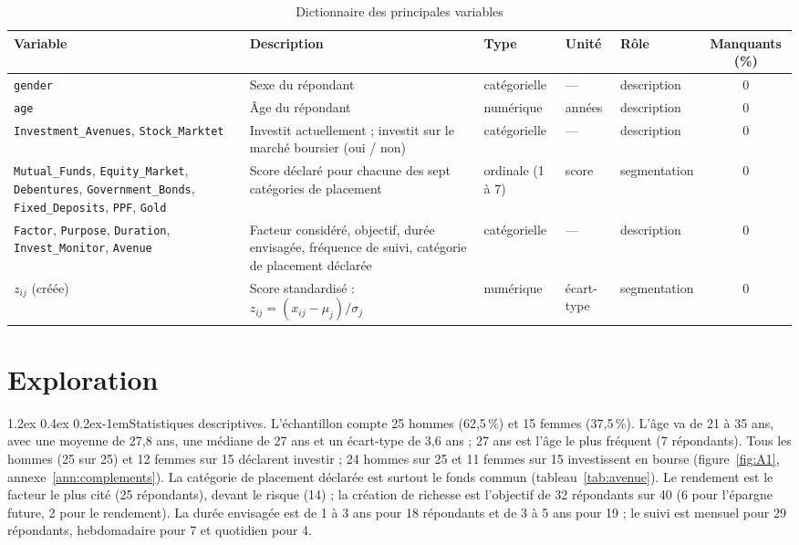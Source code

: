 \documentclass[11pt,a4paper]{article}
\makeatletter
\renewcommand\paragraph{\@startsection{paragraph}{4}{\z@}%
  {1.2ex \@plus 0.4ex \@minus 0.2ex}{-1em}{\normalfont\normalsize\bfseries}}
\makeatother
\begin{document}
\begin{table}[htbp]
  \centering
  \caption{Dictionnaire des principales variables}
  \label{tab:dictionnaire}
  \small
  \begin{tabular}{@{}l P{5.6cm} l l l c@{}}
    \toprule
    Variable & Description & Type & Unité & Rôle & Manquants (\%) \\
    \midrule
    \texttt{gender} & Sexe du répondant & catégorielle & --- & description & 0 \\
    \texttt{age} & Âge du répondant & numérique & années & description & 0 \\
    \texttt{Investment\_Avenues}, \texttt{Stock\_Marktet} & Investit actuellement ; investit sur le marché boursier (oui / non) & catégorielle & --- & description & 0 \\
    \texttt{Mutual\_Funds}, \texttt{Equity\_Market}, \texttt{Debentures}, \texttt{Government\_Bonds}, \texttt{Fixed\_Deposits}, \texttt{PPF}, \texttt{Gold} & Score déclaré pour chacune des sept catégories de placement & ordinale (1 à 7) & score & segmentation & 0 \\
    \texttt{Factor}, \texttt{Purpose}, \texttt{Duration}, \texttt{Invest\_Monitor}, \texttt{Avenue} & Facteur considéré, objectif, durée envisagée, fréquence de suivi, catégorie de placement déclarée & catégorielle & --- & description & 0 \\
    $z_{ij}$ (créée) & Score standardisé : $z_{ij} = (x_{ij} - \mu_j)/\sigma_j$ & numérique & écart-type & segmentation & 0 \\
    \bottomrule
  \end{tabular}
\end{table}

\section{Exploration}
\label{sec:exploration}
\paragraph{Statistiques descriptives.} L'échantillon compte 25 hommes (62,5\,\%) et 15 femmes (37,5\,\%). L'âge va de 21 à 35 ans, avec une moyenne de 27,8 ans, une médiane de 27 ans et un écart-type de 3,6 ans ; 27 ans est l'âge le plus fréquent (7 répondants). Tous les hommes (25 sur 25) et 12 femmes sur 15 déclarent investir ; 24 hommes sur 25 et 11 femmes sur 15 investissent en bourse (figure~\ref{fig:A1}, annexe~\ref{ann:complements}). La catégorie de placement déclarée est surtout le fonds commun (tableau~\ref{tab:avenue}). Le rendement est le facteur le plus cité (25 répondants), devant le risque (14) ; la création de richesse est l'objectif de 32 répondants sur 40 (6 pour l'épargne future, 2 pour le rendement). La durée envisagée est de 1 à 3 ans pour 18 répondants et de 3 à 5 ans pour 19 ; le suivi est mensuel pour 29 répondants, hebdomadaire pour 7 et quotidien pour 4.
\end{document}
